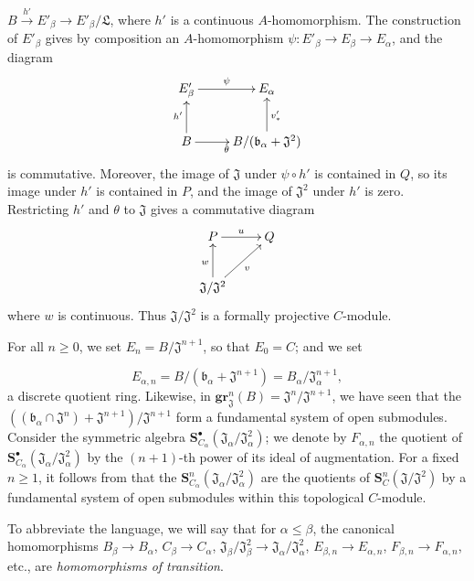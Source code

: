 \begin{env}[19.5.6.1]
$B\xrightarrow{h'}E'_\beta\to E'_\beta/\mathfrak{L}$, where $h'$ is a
continuous $A$-homomorphism.
The construction of $E'_\beta$ gives by composition an $A$-homomorphism
$\psi:E'_\beta\to E_\beta\to E_\alpha$, and the diagram
\[
  \xymatrix{
    E'_\beta \ar[r]^\psi & E_\alpha \\
    B \ar[u]^{h'} \ar[r]_\theta &
    B/(\mathfrak{b}_\alpha+\mathfrak{J}^2) \ar[u]_{v'_*}
  }
\]
is commutative.
Moreover, the image of $\mathfrak{J}$ under $\psi\circ h'$ is contained in $Q$,
so its image under $h'$ is contained in $P$, and the image of
$\mathfrak{J}^2$ under $h'$ is zero.
Restricting $h'$ and $\theta$ to $\mathfrak{J}$ gives a commutative diagram
\[
  \xymatrix{
    P \ar[r]^u & Q \\
    \mathfrak{J}/\mathfrak{J}^2 \ar[u]^w \ar[ur]_v
  }
\]
where $w$ is continuous.
Thus $\mathfrak{J}/\mathfrak{J}^2$ is a formally projective $C$-module.
\end{env}

\begin{env}[19.5.6.2]
\label{0.19.5.6.2}
For all $n\geq 0$, we set $E_n=B/\mathfrak{J}^{n+1}$, so that $E_0=C$;
and we set

\[
E_{\alpha,n}=B/(\mathfrak{b}_\alpha+\mathfrak{J}^{n+1})=B_\alpha/\mathfrak{J}_\alpha^{n+1},
\]
a discrete quotient ring.
Likewise, in $\mathbf{gr}_\mathfrak{J}^n(B)=\mathfrak{J}^n/\mathfrak{J}^{n+1}$, we have seen that the $((\mathfrak{b}_\alpha\cap\mathfrak{J}^n)+\mathfrak{J}^{n+1})/\mathfrak{J}^{n+1}$ form a fundamental system of open submodules.
Consider the symmetric algebra $\mathbf{S}_{C_\alpha}^\bullet(\mathfrak{J}_\alpha/\mathfrak{J}_\alpha^2)$;
we denote by $F_{\alpha,n}$ the quotient of $\mathbf{S}_{C_\alpha}^\bullet(\mathfrak{J}_\alpha/\mathfrak{J}_\alpha^2)$ by the $(n+1)$-th power of its ideal of augmentation.
For a fixed $n\geq 1$, it follows from  that the $\mathbf{S}_{C_\alpha}^n(\mathfrak{J}_\alpha/\mathfrak{J}_\alpha^2)$ are the quotients of $\mathbf{S}_C^n(\mathfrak{J}/\mathfrak{J}^2)$ by a fundamental system of open submodules within this topological $C$-module.

To abbreviate the language, we will say that for $\alpha\leq\beta$, the canonical homomorphisms $B_\beta\to B_\alpha$, $C_\beta\to C_\alpha$, $\mathfrak{J}_\beta/\mathfrak{J}_\beta^2\to\mathfrak{J}_\alpha/\mathfrak{J}_\alpha^2$, $E_{\beta,n}\to E_{\alpha,n}$, $F_{\beta,n}\to F_{\alpha,n}$, etc., are \emph{homomorphisms of transition}.
\end{env}

